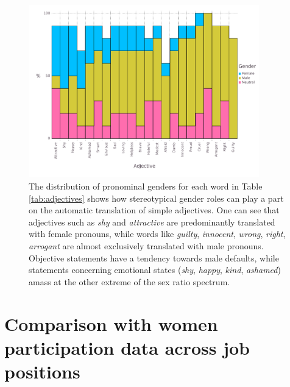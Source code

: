 \documentclass[fleqn,10pt]{article}
\begin{document}
\begin{figure}[H]
	\centering
	\includegraphics[width=10cm]{pictures/barplot-adjectives}
	\caption{The distribution of pronominal genders for each word in Table \ref{tab:adjectives} shows how stereotypical gender roles can play a part on the automatic translation of simple adjectives. One can see that adjectives such as \emph{shy} and \emph{attractive} are predominantly translated with female pronouns, while words like \emph{guilty}, \emph{innocent}, \emph{wrong}, \emph{right}, \emph{arrogant} are almost exclusively translated with male pronouns. Objective statements have a tendency towards male defaults, while statements concerning emotional states (\emph{shy}, \emph{happy}, \emph{kind}, \emph{ashamed}) amass at the other extreme of the sex ratio spectrum.}
	\label{fig:barplot-adjectives}
\end{figure}

\section{Comparison with women participation data across job positions}\label{sec:comparison-women-participation}

\citep{WB2014}
\end{document}

